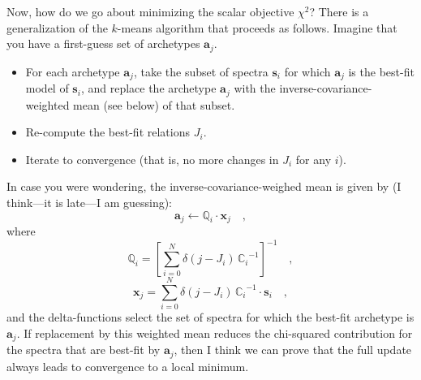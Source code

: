 \documentclass[12pt]{article}
\newcommand{\chisq}{\chi^2}
\newcommand{\Mvector}[1]{\mathbf{#1}}
\newcommand{\point}{\Mvector{s}}
\newcommand{\spectrumi}{\point_i}
\newcommand{\archetypej}{\Mvector{a}_j}
\newcommand{\xxj}{\Mvector{x}_j}
\newcommand{\Mmatrix}[1]{\mathbb{#1}}
\newcommand{\covari}{\Mmatrix{C}_i}
\newcommand{\covarj}{\Mmatrix{Q}_i}
\newcommand{\inverse}[1]{{#1}^{-1}}
\newcommand{\invcovari}{\inverse{\covari}}
\begin{document}
Now, how do we go about minimizing the scalar objective $\chisq$?
There is a generalization of the $k$-means algorithm that proceeds as
follows.  Imagine that you have a first-guess set of archetypes
$\archetypej$.
\begin{itemize}
\item For each archetype $\archetypej$, take the subset of spectra
$\spectrumi$ for which $\archetypej$ is the best-fit model of
$\spectrumi$, and replace the archetype $\archetypej$ with the
inverse-covariance-weighted mean (see below) of that subset.
\item Re-compute the best-fit relations $J_i$.
\item Iterate to convergence (that is, no more changes in $J_i$ for any $i$).
\end{itemize}
In case you were wondering, the inverse-covariance-weighed mean is
given by (I think---it is late---I am guessing):
\begin{equation}
\archetypej \leftarrow \covarj\cdot\xxj \quad ,
\end{equation}
where
\begin{equation}
\covarj = \inverse{\left[\sum_{i=0}^N \delta(j-J_i)\,\invcovari\right]} \quad ,
\end{equation}
\begin{equation}
\xxj = \sum_{i=0}^N \delta(j-J_i)\,\invcovari\cdot\spectrumi \quad ,
\end{equation}
and the delta-functions select the set of spectra for which the
best-fit archetype is $\archetypej$.  If replacement by this weighted
mean reduces the chi-squared contribution for the spectra that are
best-fit by $\archetypej$, then I think we can prove that the full
update always leads to convergence to a local minimum.
\end{document}
